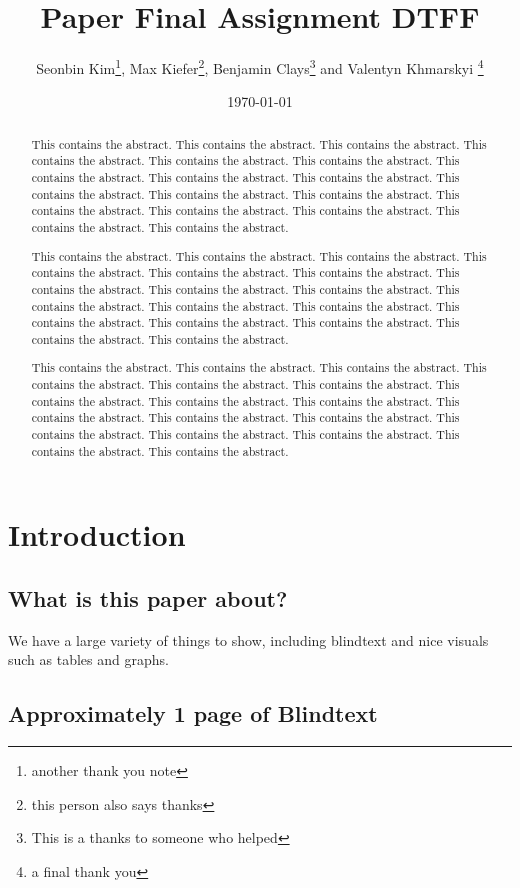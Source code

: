 \documentclass[titlepage]{article}
\title{Paper Final Assignment DTFF}
\author{Seonbin Kim\thanks{another thank you note}, Max Kiefer\thanks{this person also says thanks}, Benjamin Clays\thanks{This is a thanks to someone who helped} and Valentyn Khmarskyi \thanks{a final thank you}}
\date{\today}
\affil{Faculty of Business, Economics and Informatics, UZH}
\begin{document}
\maketitle

\begin{abstract}
This contains the abstract. This contains the abstract. This contains the abstract. This contains the abstract. This contains the abstract. This contains the abstract. This contains the abstract. This contains the abstract. This contains the abstract. This contains the abstract. This contains the abstract. This contains the abstract. This contains the abstract. This contains the abstract. This contains the abstract. This contains the abstract. This contains the abstract.
\end{abstract}
\begin{abstract}
This contains the abstract. This contains the abstract. This contains the abstract. This contains the abstract. This contains the abstract. This contains the abstract. This contains the abstract. This contains the abstract. This contains the abstract. This contains the abstract. This contains the abstract. This contains the abstract. This contains the abstract. This contains the abstract. This contains the abstract. This contains the abstract. This contains the abstract.
\end{abstract}
\begin{abstract}
This contains the abstract. This contains the abstract. This contains the abstract. This contains the abstract. This contains the abstract. This contains the abstract. This contains the abstract. This contains the abstract. This contains the abstract. This contains the abstract. This contains the abstract. This contains the abstract. This contains the abstract. This contains the abstract. This contains the abstract. This contains the abstract. This contains the abstract.
\end{abstract}
\tableofcontents

\newpage

\section{Introduction}
\subsection{What is this paper about?}
We have a large variety of things to show, including blindtext and nice visuals such as tables and graphs.
\subsection{Approximately 1 page of Blindtext}
\blindtext[1]
\par
\blindtext[2]
\par
\blindtext[2]
\par
\blindtext[1]
\end{document}
